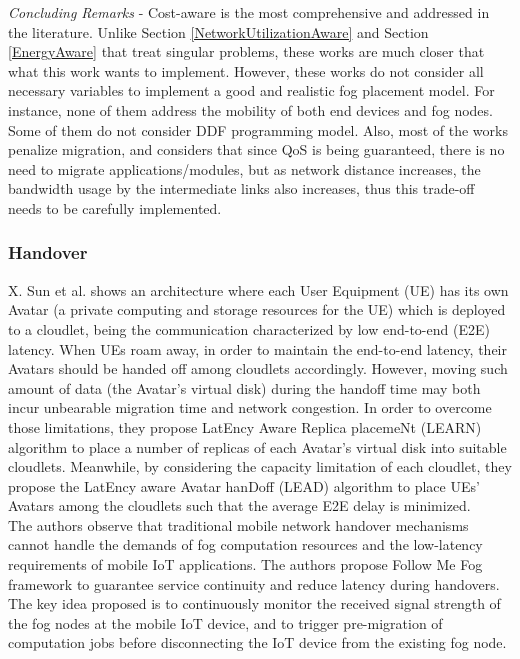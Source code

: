 \textit{Concluding Remarks} - Cost-aware is the most comprehensive and addressed in the literature. Unlike Section \ref{NetworkUtilizationAware} and Section \ref{EnergyAware} that treat singular problems, these works are much closer that what this work wants to implement. However, these works do not consider all necessary variables to implement a good and realistic fog placement model. For instance, none of them address the mobility of both end devices and fog nodes. Some of them do not consider DDF programming model. Also, most of the works penalize migration, and considers that since QoS is being guaranteed, there is no need to migrate applications/modules, but as network distance increases, the bandwidth usage by the intermediate links also increases, thus this trade-off needs to be carefully implemented. 

\subsubsection{Handover}
\noindent\tab X. Sun et al. \cite{sun2017avaptive} shows an architecture where each User Equipment (UE) has its own Avatar (a private computing and storage resources for the UE) which is deployed to a cloudlet, being the communication characterized by low end-to-end (E2E) latency. When UEs roam away, in order to maintain the end-to-end latency, their Avatars should be handed off among cloudlets accordingly. However, moving such amount of data (the Avatar’s virtual disk) during the handoff time may both incur unbearable migration time and network congestion. In order to overcome those limitations, they propose LatEncy Aware Replica placemeNt (LEARN) algorithm to place a number of replicas of each Avatar’s virtual disk into suitable cloudlets. Meanwhile, by considering the capacity limitation of each cloudlet, they propose the LatEncy aware Avatar hanDoff (LEAD) algorithm to place
UEs’ Avatars among the cloudlets such that the average E2E delay is minimized.\\ %
\cite{bao2017follow}
The authors observe that traditional mobile network handover mechanisms cannot handle the demands of fog computation resources and the low-latency requirements of mobile IoT applications. The authors propose Follow Me Fog framework to guarantee service continuity and reduce latency during handovers. The key idea proposed is to continuously monitor the received signal strength of the fog nodes at the mobile IoT device, and to trigger pre-migration of computation jobs before disconnecting the IoT device from the existing fog node.\\
